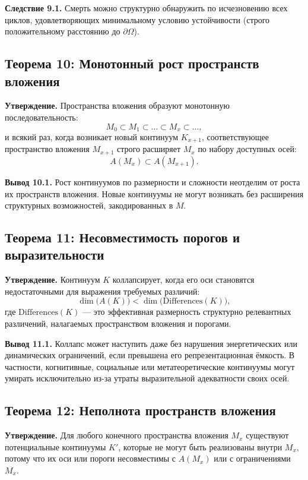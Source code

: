\textbf{Следствие 9.1.}
Смерть можно структурно обнаружить по исчезновению всех циклов, удовлетворяющих минимальному условию устойчивости (строго положительному расстоянию до \(\partial\Omega\)).

\subsection{Теорема 10: Монотонный рост пространств вложения}

\textbf{Утверждение.}
Пространства вложения образуют монотонную последовательность:
\[
    M_0 \subset M_1 \subset \dots \subset M_x \subset \dots,
\]
и всякий раз, когда возникает новый континуум \(K_{x+1}\), соответствующее пространство вложения \(M_{x+1}\) строго расширяет \(M_x\) по набору доступных осей:
\[
    A(M_{x}) \subset A(M_{x+1}).
\]

\textbf{Вывод 10.1.}
Рост континуумов по размерности и сложности неотделим от роста их пространств вложения.
Новые континуумы не могут возникать без расширения структурных возможностей, закодированных в \(M\).

\subsection{Теорема 11: Несовместимость порогов и выразительности}

\textbf{Утверждение.}
Континуум \(K\) коллапсирует, когда его оси становятся недостаточными для выражения требуемых различий:
\[
    \dim\big(A(K)\big) < \dim\big(\mathrm{Differences}(K)\big),
\]
где \(\mathrm{Differences}(K)\) --- это эффективная размерность структурно релевантных различений, налагаемых пространством вложения и порогами.

\textbf{Вывод 11.1.}
Коллапс может наступить даже без нарушения энергетических или динамических ограничений, если превышена его репрезентационная ёмкость.
В частности, когнитивные, социальные или метатеоретические континуумы могут умирать исключительно из-за утраты выразительной адекватности своих осей.

\subsection{Теорема 12: Неполнота пространств вложения}

\textbf{Утверждение.}
Для любого конечного пространства вложения \(M_x\) существуют потенциальные континуумы \(K'\), которые не могут быть реализованы внутри \(M_x\), потому что их оси или пороги несовместимы с \(A(M_x)\) или с ограничениями \(M_x\).

